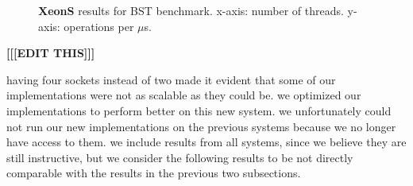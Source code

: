 \begin{figure}
    \centering
    \setlength\tabcolsep{0pt}
\caption{\textbf{XeonS} results for BST benchmark. x-axis: number of threads. y-axis: operations per $\mu$s.}
\label{fig-exp-xeons}
\end{figure}

\textbf{[[[EDIT THIS]]]}

having four sockets instead of two made it evident that some of our implementations were not as scalable as they could be. we optimized our implementations to perform better on this new system. we unfortunately could not run our new implementations on the previous systems because we no longer have access to them. we include results from all systems, since we believe they are still instructive, but we consider the following results to be not directly comparable with the results in the previous two subsections.

